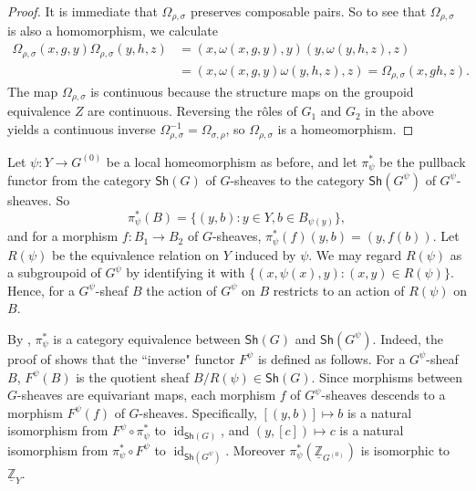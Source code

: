\documentclass[12pt,a4paper]{amsart}
\newcommand{\field}[1]{\mathbb{#1}}
\newcommand{\ZZ}{\field{Z}}
\newcommand{\id}{\operatorname{id}}
\newcommand{\Sheaf}[1]{\mathsf{Sh}(#1)}
\newcommand{\unit}[1]{#1}%
\begin{document}
\begin{proof}
It is immediate that $\Omega_{\rho,\sigma}$ preserves composable
pairs. So to see that $\Omega_{\rho,\sigma}$ is also a
homomorphism, we calculate
\begin{align*}
\Omega_{\rho,\sigma}(x,g,y)\Omega_{\rho,\sigma}(y,h,z)
    &= (x, \omega(x,g,y), y)(y, \omega(y,h,z), z) \\
    &= (x, \omega(x,g,y)\omega(y,h,z), z)
    = \Omega_{\rho,\sigma}(x, gh, z).
\end{align*}
The map $\Omega_{\rho,\sigma}$ is continuous because the
structure maps on the groupoid equivalence $Z$ are continuous.
Reversing the r\^oles of $G_1$ and $G_2$ in the above yields a
continuous inverse $\Omega_{\rho,\sigma}^{-1} =
\Omega_{\sigma,\rho}$, so $\Omega_{\rho,\sigma}$ is a
homeomorphism.
\end{proof}

Let $\psi : Y \to G^{(0)}$ be a local homeomorphism as before,
and let $\pi_\psi^*$ be the pullback functor from the category
$\Sheaf{G}$ of $G$-sheaves to the category $\Sheaf{G^\psi}$ of
$G^\psi$-sheaves. So
\[
    \pi_\psi^*(B) = \{(y,b) : y \in Y, b \in B_{\psi(y)}\},
\]
and for a morphism $f : B_1 \to B_2$ of $G$-sheaves,
$\pi_\psi^*(f)(y,b) = (y,f(b))$. Let $R(\psi)$ be the
equivalence relation on $Y$ induced by $\psi$. We may regard
$R(\psi)$ as a subgroupoid of $G^\psi$ by identifying it with
$\{(x, \unit{\psi(x)}, y) : (x,y) \in R(\psi)\}$. Hence, for a
$G^\psi$-sheaf $B$ the action of $G^\psi$ on $B$ restricts to
an action of $R(\psi)$ on $B$.

By\label{pg:pi_psi,F^psi} \cite[Theorem~0.9]{Kumjian1988},
$\pi_\psi^*$ is a category equivalence between $\Sheaf{G}$ and
$\Sheaf{G^\psi}$. Indeed, the proof of
\cite[Theorem~0.9]{Kumjian1988} shows that the ``inverse"
functor $F^\psi$ is defined as follows. For a $G^\psi$-sheaf
$B$, $F^\psi(B)$ is the quotient sheaf $B/R(\psi) \in
\Sheaf{G}$. Since morphisms between $G$-sheaves are equivariant
maps, each morphism $f$ of $G^\psi$-sheaves descends to a
morphism $F^\psi(f)$ of $G$-sheaves. Specifically, $[(y,b)]
\mapsto b$ is a natural isomorphism from
$F^\psi\circ\pi_{\psi}^*$ to $\id_{\Sheaf{G}}$, and $(y, [c])
\mapsto c$ is a natural isomorphism from $\pi_\psi^* \circ
F^\psi$ to $\id_{\Sheaf{G^\psi}}$. Moreover
$\pi_\psi^*(\underline{\ZZ}_{G^{(0)}})$ is isomorphic to
$\underline{\ZZ}_Y$.
\end{document}
